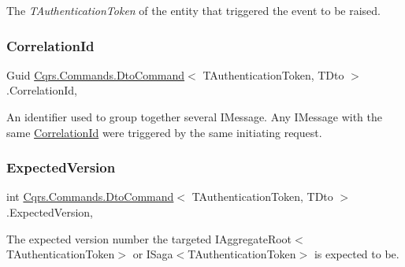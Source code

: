 The {\itshape T\+Authentication\+Token}  of the entity that triggered the event to be raised. 

\mbox{\label{classCqrs_1_1Commands_1_1DtoCommand_aeb60eb40f2a201fd63e846d728768cdf_aeb60eb40f2a201fd63e846d728768cdf}} 
\subsubsection{\texorpdfstring{Correlation\+Id}{CorrelationId}}
{\footnotesize\ttfamily Guid \hyperlink{classCqrs_1_1Commands_1_1DtoCommand}{Cqrs.\+Commands.\+Dto\+Command}$<$ T\+Authentication\+Token, T\+Dto $>$.Correlation\+Id\hspace{0.3cm}{\ttfamily [get]}, {\ttfamily [set]}}



An identifier used to group together several I\+Message. Any I\+Message with the same \hyperlink{classCqrs_1_1Commands_1_1DtoCommand_aeb60eb40f2a201fd63e846d728768cdf_aeb60eb40f2a201fd63e846d728768cdf}{Correlation\+Id} were triggered by the same initiating request. 

\mbox{\label{classCqrs_1_1Commands_1_1DtoCommand_a9429ca1b2c6576c36d46912a18e5dc18_a9429ca1b2c6576c36d46912a18e5dc18}} 
\subsubsection{\texorpdfstring{Expected\+Version}{ExpectedVersion}}
{\footnotesize\ttfamily int \hyperlink{classCqrs_1_1Commands_1_1DtoCommand}{Cqrs.\+Commands.\+Dto\+Command}$<$ T\+Authentication\+Token, T\+Dto $>$.Expected\+Version\hspace{0.3cm}{\ttfamily [get]}, {\ttfamily [set]}}



The expected version number the targeted I\+Aggregate\+Root$<$\+T\+Authentication\+Token$>$ or I\+Saga$<$\+T\+Authentication\+Token$>$ is expected to be. 

